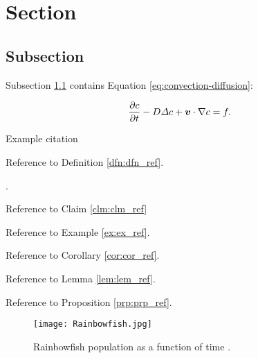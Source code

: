 \section{Section}\label{sse:Section}

\subsection{Subsection}\label{sss:Subsection}

Subsection \ref{sss:Subsection} contains Equation \eqref{eq:convection-diffusion}:

\begin{equation}\label{eq:convection-diffusion}
    \frac{\p c}{\p t} - D \Delta c + \mathbfit{v}\cdot\nabla c = f.
\end{equation}

Example citation \citep{baarslag2015learning}


Reference to Definition \ref{dfn:dfn_ref}.


.


Reference to Claim \ref{clm:clm_ref}


Reference to Example \ref{ex:ex_ref}.




Reference to Corollary \ref{cor:cor_ref}.


Reference to Lemma \ref{lem:lem_ref}.


Reference to Proposition \ref{prp:prp_ref}.

\begin{figure}[H]
    \centering
    \texttt{[image: Rainbowfish.jpg]}
    \caption[Rainbowfish population as a function of time]{Rainbowfish population as a function of time \citep{tudelftopencourseware}.}
    \label{fig:Rainbowfish}
\end{figure}

